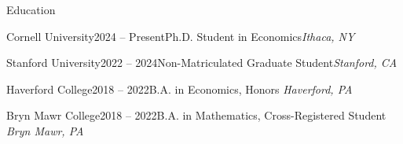 \documentclass{resume}
\begin{document}
\begin{rSection}{Education}
\begin{rSubsection}{Cornell University}{2024 -- Present}{Ph.D. Student in Economics}{\em Ithaca, NY}
\item[]
\vspace{-1cm}
\end{rSubsection}

\begin{rSubsection}{Stanford University}{2022 -- 2024}{Non-Matriculated Graduate Student}{\em Stanford, CA}
\item[]
\vspace{-1cm}
\end{rSubsection}
\begin{rSubsection}{Haverford College}{2018 -- 2022}{B.A. in Economics, Honors \hfill \em Haverford, PA \\}{}
\item[]
\vspace{-1cm}
\vspace{-0.5cm}
\end{rSubsection}
\begin{rSubsection} {Bryn Mawr College}{2018 -- 2022}{B.A. in Mathematics, Cross-Registered Student \hfill \em Bryn Mawr, PA \\ }{}
\item[]
\vspace{-1cm}
\vspace{-0.5cm}
\end{rSubsection}
\end{rSection}
\end{document}
